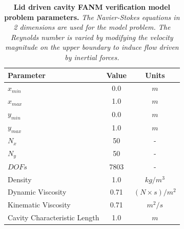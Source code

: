 \begin{table}[h!]
  \begin{center}
    \begin{tabular}{lcc}\hline\hline
      \multicolumn{1}{l}{Parameter}& 
      \multicolumn{1}{c}{Value}&
      \multicolumn{1}{c}{Units}\\\hline
      $x_{min}$ & 0.0 & $m$ \\
      $x_{max}$ & 1.0 & $m$ \\
      $y_{min}$ & 0.0 & $m$ \\
      $y_{max}$ & 1.0 & $m$ \\
      $N_x$ & 50 & - \\
      $N_y$ & 50 & - \\
      $DOFs$ & 7803 & - \\
      Density & 1.0 & $kg / m^3$ \\
      Dynamic Viscosity & 0.71 & $(N \times s) / m^2$ \\
      Kinematic Viscosity & 0.71 & $m^2 / s$ \\
      Cavity Characteristic Length & 1.0 & $m$ \\
      \hline\hline
    \end{tabular}
  \end{center}
  \caption{\textbf{Lid driven cavity FANM verification model
      problem parameters.}  \textit{The Navier-Stokes equations in 2
      dimensions are used for the model problem. The Reynolds number
      is varied by modifying the velocity magnitude on the upper
      boundary to induce flow driven by inertial forces.}}
  \label{tab:lid_driven_parameters}
\end{table}

